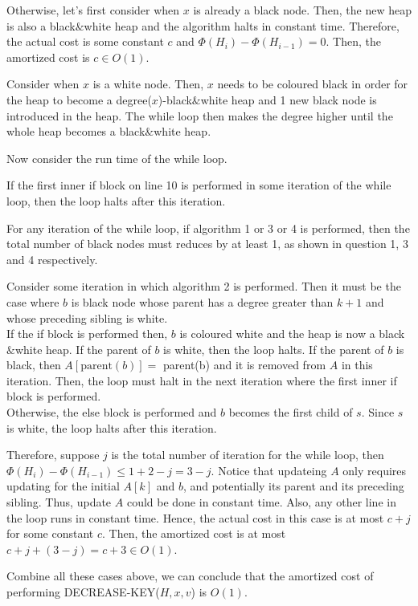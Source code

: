 \documentclass[10pt]{article}
\begin{document}
\begin{enumerate}
		Otherwise, let's first consider when $x$ is already a black node.
		Then, the new heap is also a black$\&$white heap and the algorithm
		halts in constant time.
		Therefore, the actual cost is some constant $c$ and $\Phi(H_i) -
		\Phi(H_{i-1}) = 0$.
		Then, the amortized cost is $c \in O(1)$.

		Consider when $x$ is a white node.
		Then, $x$ needs to be coloured black in order for the heap to become a
		degree($x$)-black$\&$white heap and 1 new black node is introduced in
		the heap.
		The while loop then makes the degree higher until the whole heap becomes
		a black$\&$white heap.

		Now consider the run time of the while loop.

		If the first inner if block on line 10 is performed in some iteration
		of the while loop, then the loop halts after this iteration.

		For any iteration of the while loop, if algorithm 1 or 3 or 4 is
		performed, then the total number of black nodes must reduces by at
		least 1, as shown in question 1, 3 and 4 respectively. 

		Consider some iteration in which algorithm 2 is performed.
		Then it must be the case where $b$ is black node whose parent has a
		degree greater than $k+1$ and whose preceding sibling is white. \\
		If the if block is performed then, $b$ is coloured white and the heap
		is now a black$\&$white heap.
		If the parent of $b$ is white, then the loop halts.
		If the parent of $b$ is black, then $A[\text{parent}(b)] =$ parent(b)
		and it is removed from $A$ in this iteration.
		Then, the loop must halt in the next iteration where the first inner if
		block is performed. \\
		Otherwise, the else block is performed and $b$ becomes the first child
		of $s$.
		Since $s$ is white, the loop halts after this iteration.

		Therefore, suppose $j$ is the total number of iteration for the while
		loop, then $\Phi(H_i) - \Phi(H_{i-1}) \leq 1+2-j = 3-j$.
		Notice that updateing $A$ only requires updating for the initial $A[k]$
		and $b$, and potentially its parent and its preceding sibling. 
		Thus, update $A$ could be done in constant time. 
		Also, any other line in the loop runs in constant time.
		Hence, the actual cost in this case is at most $c + j$ for some
		constant $c$. 
		Then, the amortized cost is at most $c+j+(3-j) = c+3 \in O(1)$.

		Combine all these cases above, we can conclude that the amortized cost
		of performing DECREASE-KEY($H,x,v$) is $O(1)$.


\end{enumerate}
\end{document}
